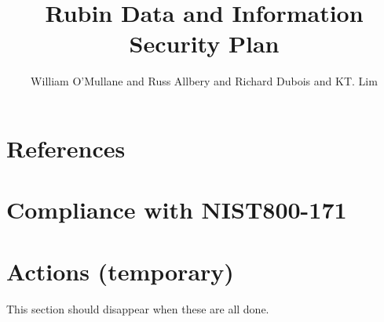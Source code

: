 \documentclass[OPS,lsstdraft,authoryear,toc]{lsstdoc}
\title{Rubin Data and Information Security Plan}
\author{%
William O'Mullane and Russ Allbery and Richard Dubois and KT. Lim
}
\date{\vcsDate}
\begin{document}
\maketitle


\appendix
\section{References} \label{sec:bib}
\renewcommand{\refname}{} %


\section{Compliance with NIST800-171} \label{ap:compliance}


%
\printglossaries

\section{Actions (temporary) }
This section should disappear when these are all done.
\listofactions
\end{document}

